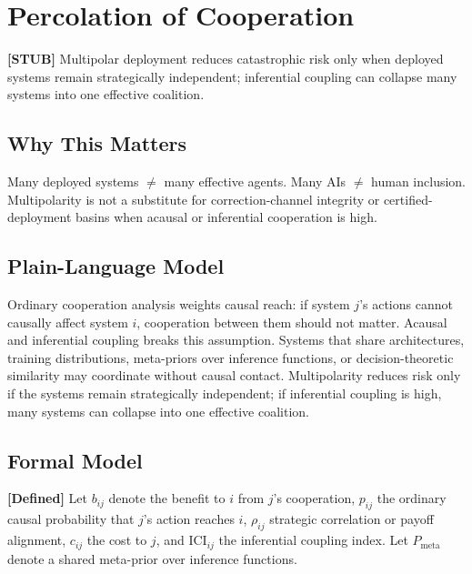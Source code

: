 
\chapter{Percolation of Cooperation}
\label{ch:cooperation-percolation}

\begin{chapterthesis}
\textbf{[STUB]} Multipolar deployment reduces catastrophic risk only when deployed systems remain strategically independent; inferential coupling can collapse many systems into one effective coalition.
\end{chapterthesis}

\section{Why This Matters}

Many deployed systems $\neq$ many effective agents.
Many AIs $\neq$ human inclusion.
Multipolarity is not a substitute for correction-channel integrity or certified-deployment basins when acausal or inferential cooperation is high.

\section{Plain-Language Model}

Ordinary cooperation analysis weights causal reach: if system $j$'s actions cannot causally affect system $i$, cooperation between them should not matter.
Acausal and inferential coupling breaks this assumption.
Systems that share architectures, training distributions, meta-priors over inference functions, or decision-theoretic similarity may coordinate without causal contact.
Multipolarity reduces risk only if the systems remain strategically independent; if inferential coupling is high, many systems can collapse into one effective coalition.

\section{Formal Model}

\textbf{[Defined]} Let $b_{ij}$ denote the benefit to $i$ from $j$'s cooperation, $p_{ij}$ the ordinary causal probability that $j$'s action reaches $i$, $\rho_{ij}$ strategic correlation or payoff alignment, $c_{ij}$ the cost to $j$, and $\mathrm{ICI}_{ij}$ the inferential coupling index.
Let $P_{\text{meta}}$ denote a shared meta-prior over inference functions.

